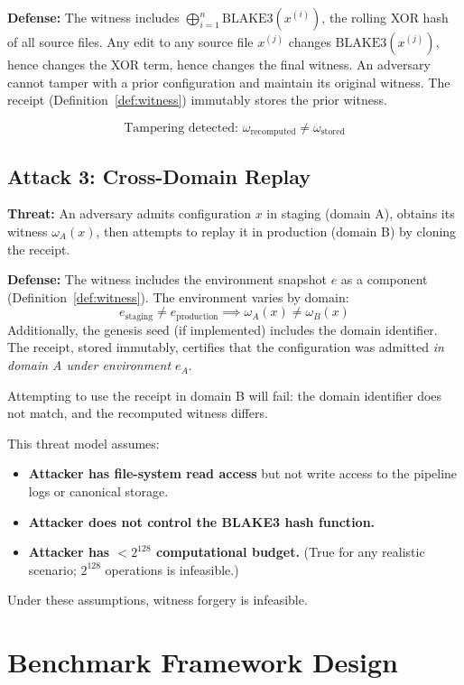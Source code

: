 \textbf{Defense:}
The witness includes $\bigoplus_{i=1}^{n} \mathrm{BLAKE3}(x^{(i)})$,
the rolling XOR hash of all source files.
Any edit to any source file $x^{(j)}$ changes $\mathrm{BLAKE3}(x^{(j)})$,
hence changes the XOR term, hence changes the final witness.
An adversary cannot tamper with a prior configuration and maintain its
original witness. The receipt (Definition~\ref{def:witness}) immutably
stores the prior witness.

\[
  \text{Tampering detected: } \omega_{\mathrm{recomputed}} \neq \omega_{\mathrm{stored}}
\]

\subsection{Attack 3: Cross-Domain Replay}

\textbf{Threat:} An adversary admits configuration $x$ in staging (domain A),
obtains its witness $\omega_A(x)$, then attempts to replay it in production
(domain B) by cloning the receipt.

\textbf{Defense:}
The witness includes the environment snapshot $e$ as a component
(Definition~\ref{def:witness}). The environment varies by domain:
\[
  e_{\mathrm{staging}} \neq e_{\mathrm{production}}
  \implies \omega_A(x) \neq \omega_B(x)
\]
Additionally, the genesis seed (if implemented) includes the domain identifier.
The receipt, stored immutably, certifies that the configuration was admitted
\emph{in domain A under environment $e_A$}.

Attempting to use the receipt in domain B will fail: the domain identifier
does not match, and the recomputed witness differs.

\begin{remark}
This threat model assumes:
\begin{itemize}
  \item \textbf{Attacker has file-system read access} but not write access
        to the pipeline logs or canonical storage.
  \item \textbf{Attacker does not control the BLAKE3 hash function.}
  \item \textbf{Attacker has $< 2^{128}$ computational budget.}
        (True for any realistic scenario; $2^{128}$ operations is infeasible.)
\end{itemize}
Under these assumptions, witness forgery is infeasible.
\end{remark}

\section{Benchmark Framework Design}

